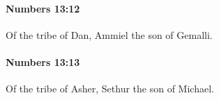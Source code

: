 		\paragraph{Numbers 13:12} %
			\label{NUMBERS-13-12}

			Of the tribe of Dan, Ammiel the son of Gemalli.


		\paragraph{Numbers 13:13} %
			\label{NUMBERS-13-13}

			Of the tribe of Asher, Sethur the son of Michael.


